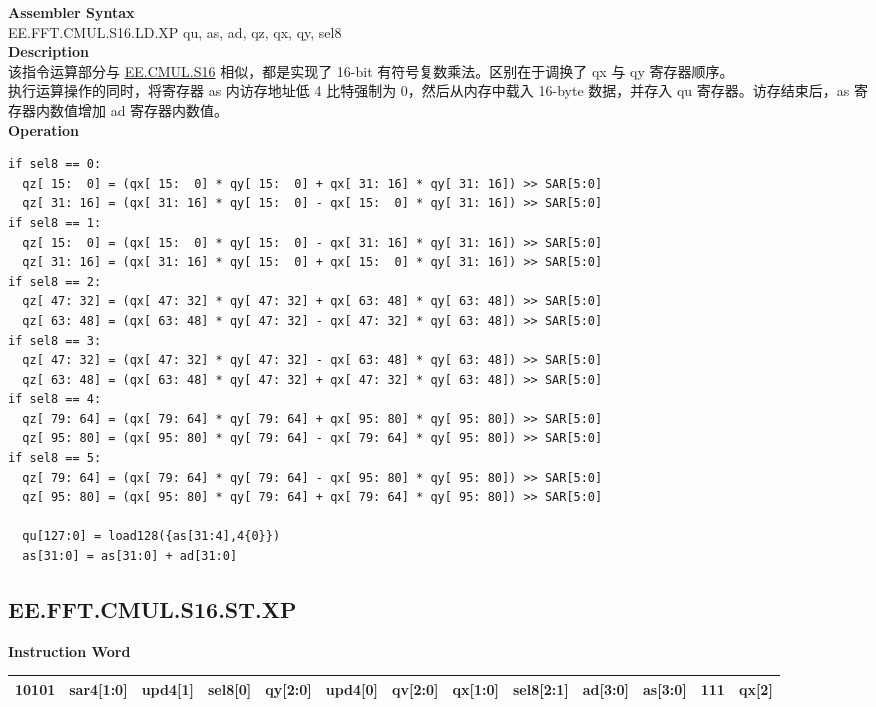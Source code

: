 \textbf{Assembler Syntax} \\
EE.FFT.CMUL.S16.LD.XP qu, as, ad, qz, qx, qy, sel8 \\
\textbf{Description} \\
该指令运算部分与 \hyperref[instruction:EECMULS16]{EE.CMUL.S16} 相似，都是实现了 16-bit 有符号复数乘法。区别在于调换了 qx 与 qy 寄存器顺序。\\
执行运算操作的同时，将寄存器 as 内访存地址低 4 比特强制为 0，然后从内存中载入 16-byte 数据，并存入 qu 寄存器。访存结束后，as 寄存器内数值增加 ad 寄存器内数值。\\
\textbf{Operation}
\begin{lstlisting}
if sel8 == 0:
  qz[ 15:  0] = (qx[ 15:  0] * qy[ 15:  0] + qx[ 31: 16] * qy[ 31: 16]) >> SAR[5:0]
  qz[ 31: 16] = (qx[ 31: 16] * qy[ 15:  0] - qx[ 15:  0] * qy[ 31: 16]) >> SAR[5:0]
if sel8 == 1:
  qz[ 15:  0] = (qx[ 15:  0] * qy[ 15:  0] - qx[ 31: 16] * qy[ 31: 16]) >> SAR[5:0]
  qz[ 31: 16] = (qx[ 31: 16] * qy[ 15:  0] + qx[ 15:  0] * qy[ 31: 16]) >> SAR[5:0]
if sel8 == 2:
  qz[ 47: 32] = (qx[ 47: 32] * qy[ 47: 32] + qx[ 63: 48] * qy[ 63: 48]) >> SAR[5:0]
  qz[ 63: 48] = (qx[ 63: 48] * qy[ 47: 32] - qx[ 47: 32] * qy[ 63: 48]) >> SAR[5:0]
if sel8 == 3:
  qz[ 47: 32] = (qx[ 47: 32] * qy[ 47: 32] - qx[ 63: 48] * qy[ 63: 48]) >> SAR[5:0]
  qz[ 63: 48] = (qx[ 63: 48] * qy[ 47: 32] + qx[ 47: 32] * qy[ 63: 48]) >> SAR[5:0]
if sel8 == 4:
  qz[ 79: 64] = (qx[ 79: 64] * qy[ 79: 64] + qx[ 95: 80] * qy[ 95: 80]) >> SAR[5:0]
  qz[ 95: 80] = (qx[ 95: 80] * qy[ 79: 64] - qx[ 79: 64] * qy[ 95: 80]) >> SAR[5:0]
if sel8 == 5:
  qz[ 79: 64] = (qx[ 79: 64] * qy[ 79: 64] - qx[ 95: 80] * qy[ 95: 80]) >> SAR[5:0]
  qz[ 95: 80] = (qx[ 95: 80] * qy[ 79: 64] + qx[ 79: 64] * qy[ 95: 80]) >> SAR[5:0]

  qu[127:0] = load128({as[31:4],4{0}})
  as[31:0] = as[31:0] + ad[31:0]
\end{lstlisting}

\clearpage
\subsection{EE.FFT.CMUL.S16.ST.XP}\label{instruction:EEFFTCMULS16STXP}
\setlength\tabcolsep{5pt}
\textbf{Instruction Word} \\
\begin{tabular}{|c|c|c|c|c|c|c|c|c|c|c|c|c|}
	\hline
	10101 & sar4[1:0] & upd4[1] & sel8[0] & qy[2:0] & upd4[0] & qv[2:0] & qx[1:0] & sel8[2:1] & ad[3:0] & as[3:0] & 111 & qx[2] \\
	\hline
\end{tabular}

